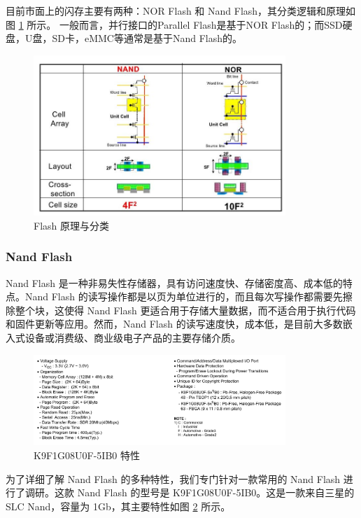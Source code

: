 目前市面上的闪存主要有两种：NOR Flash 和 Nand Flash，其分类逻辑和原理如图 \ref {flash-nand-nor} 所示。
一般而言，并行接口的Parallel Flash是基于NOR Flash的；而SSD硬盘，U盘，SD卡，eMMC等通常是基于Nand Flash的。

\begin{figure}[htbp]
  \centering
  \includegraphics[width=0.85\textwidth]{fig/flash-nand-nor}
  \caption{Flash 原理与分类}
  \label{flash-nand-nor}
\end{figure}

\subsubsection{Nand Flash}
\label{flash-nand}

Nand Flash 是一种非易失性存储器，具有访问速度快、存储密度高、成本低的特点。Nand Flash 的读写操作都是以页为单位进行的，而且每次写操作都需要先擦除整个块，这使得 Nand Flash 更适合用于存储大量数据，而不适合用于执行代码和固件更新等应用。然而，Nand Flash 的读写速度快，成本低，是目前大多数嵌入式设备或消费级、商业级电子产品的主要存储介质。

\begin{figure}[htbp]
  \centering
  \includegraphics[width=0.85\textwidth]{fig/flash-nand-feature}
  \caption{K9F1G08U0F-5IB0 特性}
  \label{flash-nand-feature}
\end{figure}

为了详细了解 Nand Flash 的多种特性，我们专门针对一款常用的 Nand Flash 进行了调研。这款 Nand Flash 的型号是 K9F1G08U0F-5IB0。这是一款来自三星的 SLC Nand，容量为 1Gb，其主要特性如图 \ref{flash-nand-feature} 所示。

